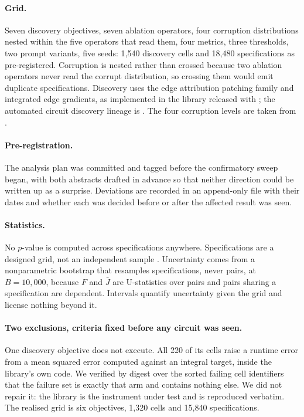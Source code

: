 \documentclass[11pt]{article}
\begin{document}
\paragraph{Grid.} Seven discovery objectives, seven ablation operators, four
corruption distributions nested within the five operators that read them, four
metrics, three thresholds, two prompt variants, five seeds: 1{,}540 discovery
cells and 18{,}480 specifications as pre-registered. Corruption is nested rather
than crossed because two ablation operators never read the corrupt distribution,
so crossing them would emit duplicate specifications. Discovery uses the edge
attribution patching family \citep{syed2023} and integrated edge gradients, as
implemented in the library released with \citet{miller2024}; the automated circuit
discovery lineage is \citet{conmy2023}. The four corruption levels are taken from
\citet{wang2022}.

\paragraph{Pre-registration.} The analysis plan was committed and tagged before
the confirmatory sweep began, with both abstracts drafted in advance so that
neither direction could be written up as a surprise. Deviations are recorded in an
append-only file with their dates and whether each was decided before or after the
affected result was seen.

\paragraph{Statistics.} No $p$-value is computed across specifications anywhere.
Specifications are a designed grid, not an independent sample
\citep{steegen2016,simonsohn2020}. Uncertainty comes from a nonparametric
bootstrap that resamples specifications, never pairs, at $B = 10{,}000$, because
$F$ and $\bar{J}$ are U-statistics over pairs and pairs sharing a specification
are dependent. Intervals quantify uncertainty given the grid and license nothing
beyond it.

\paragraph{Two exclusions, criteria fixed before any circuit was seen.} One
discovery objective does not execute. All 220 of its cells raise a runtime error
from a mean squared error computed against an integral target, inside the
library's own code. We verified by digest over the sorted failing cell
identifiers that the failure set is exactly that arm and contains nothing else. We
did not repair it: the library is the instrument under test and is reproduced
verbatim. The realised grid is six objectives, 1{,}320 cells and 15{,}840
specifications.
\end{document}
